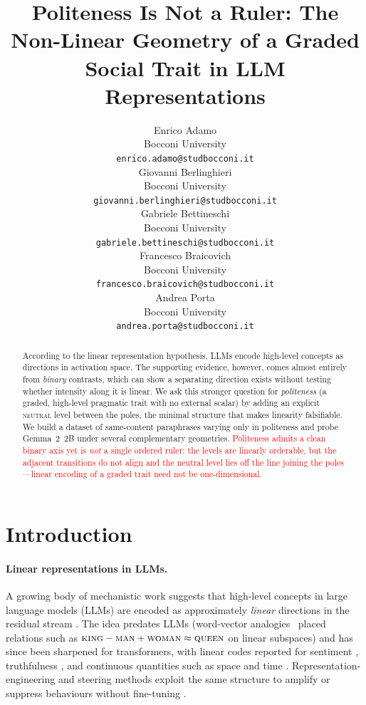 \documentclass{article}
\title{Politeness Is Not a Ruler: The Non-Linear Geometry of a Graded Social Trait in LLM Representations}
\author{%
  Enrico Adamo \\
  Bocconi University \\
  \texttt{enrico.adamo@studbocconi.it} \\
  \And
  Giovanni Berlinghieri \\
  Bocconi University \\
  \texttt{giovanni.berlinghieri@studbocconi.it} \\
  \And
  Gabriele Bettineschi \\
  Bocconi University \\
  \texttt{gabriele.bettineschi@studbocconi.it} \\
  \And
  Francesco Braicovich \\
  Bocconi University \\
  \texttt{francesco.braicovich@studbocconi.it} \\
  \And
  Andrea Porta \\
  Bocconi University \\
  \texttt{andrea.porta@studbocconi.it} \\
}
\begin{document}
\maketitle
\begin{abstract}
According to the linear representation hypothesis, LLMs encode high-level concepts as directions in activation space. The supporting evidence, however, comes almost entirely from \emph{binary} contrasts, which can show a separating direction exists without testing whether intensity along it is linear. We ask this stronger question for
\emph{politeness} (a graded, high-level pragmatic trait with no external
scalar) by adding an explicit \textsc{neutral} level between the poles, the
minimal structure that makes linearity falsifiable. We build a dataset of
same-content paraphrases varying only in politeness and probe Gemma~2~2B under
several complementary geometries. \textcolor{red}{Politeness admits a clean binary
axis yet is \emph{not} a single ordered ruler: the levels are linearly orderable,
but the adjacent transitions do not align and the neutral level lies off the line
joining the poles---linear encoding of a graded trait need not be
one-dimensional.}
\end{abstract}

\section{Introduction}\label{sec:introduction}

\paragraph{Linear representations in LLMs.}
A growing body of mechanistic work suggests that high-level concepts in large
language models (LLMs) are encoded as approximately \emph{linear} directions in
the residual stream \citep{elhage2021mathematical,park2024linear}. The idea
predates LLMs (word-vector analogies~\citep{mikolov2013distributed} placed
relations such as $\textsc{king} - \textsc{man} + \textsc{woman} \approx
\textsc{queen}$ on linear subspaces) and has since been sharpened for
transformers, with linear codes reported for sentiment \citep{tigges2023linear},
truthfulness \citep{marks2024geometry}, and continuous quantities such as space
and time \citep{gurnee2024language}. Representation-engineering and steering
methods exploit the same structure to amplify or suppress behaviours without
fine-tuning
\citep{zou2023representation,turner2023activation,subramani2022extracting,rimsky2024}.
\end{document}
